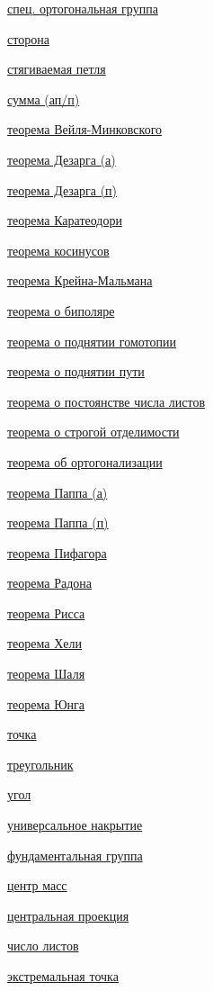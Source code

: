 \documentclass[a4paper,100pt]{article}
\theoremstyle{indented}
\theoremstyle{definition}
\theoremstyle{remark}
\begin{document}
\begin{multicols}{2}
    \hyperlink{s76}{спец. ортогональная группа} \ 

    \hyperlink{s50}{сторона} \ 

    \hyperlink{s123}{стягиваемая петля} \ 
    
    \hyperlink{s20}{сумма (ап/п)} \ 

    \hyperlink{s104}{теорема Вейля-Минковского} \ 

    \hyperlink{s51}{теорема Дезарга (а)} \
    
    \hyperlink{s52}{теорема Дезарга (п)} \ 

    \hyperlink{s92}{теорема Каратеодори} \ 

    \hyperlink{s59}{теорема косинусов} \ 

    \hyperlink{s102}{теорема Крейна-Мальмана} \ 

    \hyperlink{s106}{теорема о биполяре} \ 

    \hyperlink{s122}{теорема о поднятии гомотопии} \ 

    \hyperlink{s120}{теорема о поднятии пути} \ 

    \hyperlink{s117}{теорема о постоянстве числа листов} \ 

    \hyperlink{s99}{теорема о строгой отделимости} \ 

    \hyperlink{s64}{теорема об ортогонализации} \ 

    \hyperlink{s46}{теорема Паппа (а)} \
    
    \hyperlink{s47}{теорема Паппа (п)} \ 

    \hyperlink{s62}{теорема Пифагора} \ 

    \hyperlink{s93}{теорема Радона} \ 

    \hyperlink{s70}{теорема Рисса} \ 

    \hyperlink{s94}{теорема Хели} \ 

    \hyperlink{s87}{теорема Шаля} \ 

    \hyperlink{s95}{теорема Юнга} \ 
    
    \hyperlink{s2}{точка} \ 

    \hyperlink{s48}{треугольник} \ 

    \hyperlink{s58}{угол} \ 

    \hyperlink{s125}{универсальное накрытие} \ 

    \hyperlink{s113}{фундаментальная группа} \ 
    
    \hyperlink{s12}{центр масс} \ 

    \hyperlink{s44}{центральная проекция} \ 

    \hyperlink{s118}{число листов} \ 

    \hyperlink{s101}{экстремальная точка} \ 

\end{multicols}
\end{document}
